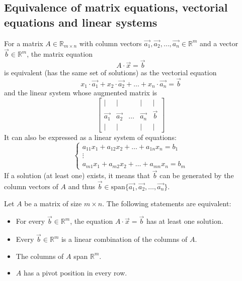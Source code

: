 \subsection{Equivalence of matrix equations, vectorial equations and linear systems}
For a matrix $A \in \mathbb{R}_{m \times n}$ with column vectors $\vec{a_1}, \vec{a_2}, \ldots, \vec{a_n} \in \mathbb{R}^m$ and a vector $\vec{b} \in \mathbb{R}^m$, the matrix equation 
\[
    A \cdot \vec{x} = \vec{b}
\]
is equivalent (has the same set of solutions) as the vectorial equation 
\[
    x_1 \cdot \vec{a_1} + x_2 \cdot \vec{a_2} + \ldots + x_n \cdot \vec{a_n} = \vec{b}
\]
and the linear system whose augmented matrix is
\[
    \begin{bmatrix}
    | & | & & | & | \\
    \vec{a_1} & \vec{a_2} & \ldots & \vec{a_n} & \vec{b} \\
    | & | & & | & | 
    \end{bmatrix}
\]
It can also be expressed as a linear system of equations:
\[
    \begin{cases}
        a_{11}x_1 + a_{12}x_2 + \ldots + a_{1n}x_n = b_1 \\
        \vdots \\
        a_{m1}x_1 + a_{m2}x_2 + \ldots + a_{mn}x_n = b_m
    \end{cases}
\]
If a solution (at least one) exists, it means that $\vec{b}$ can be generated by the column vectors of $A$ and thus $\vec{b} \in \text{span}\{\vec{a_1}, \vec{a_2}, \ldots, \vec{a_n}\}$.
\begin{theorem}
    Let $A$ be a matrix of size $m \times n$. The following statements are equivalent:
    \begin{itemize}[itemsep=1pt,label=$\circ$]
        \item For every $\vec{b} \in \mathbb{R}^m$, the equation $A \cdot \vec{x} = \vec{b}$ has at least one solution.
        \item Every $\vec{b} \in \mathbb{R}^m$ is a linear combination of the columns of $A$.
        \item The columns of $A$ span $\mathbb{R}^m$.
        \item $A$ has a pivot position in every row.
    \end{itemize}
\end{theorem}

